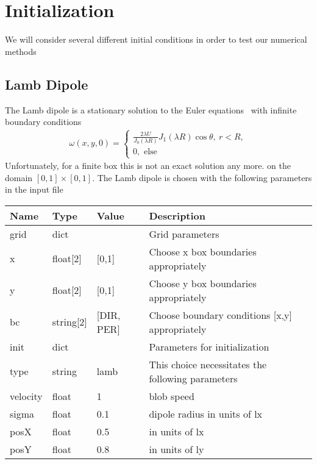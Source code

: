 \section{Initialization}
We will consider several different initial conditions in order to test
our numerical methods
\subsection{Lamb Dipole}
The Lamb dipole is a stationary solution to the Euler equations~\cite{Nielsen1997} with infinite
boundary conditions
\begin{align}
    \omega(x,y,0) = \begin{cases}
        \frac{2\lambda U}{J_0(\lambda R)} J_1(\lambda R) \cos \theta,\ r < R,\\
        0, \text{ else}
    \end{cases}
\end{align}
Unfortunately, for a finite box this is not an exact solution any more.
on the domain $[0,1]\times [0,1]$.
The Lamb dipole is chosen with the following parameters in the input file
\begin{longtable}{llll}
\toprule
\rowcolor{gray!50}\textbf{Name} &  \textbf{Type} & \textbf{Value}  & \textbf{Description}  \\ \midrule
grid & dict &  & Grid parameters \\
\qquad x & float[2]& [0,1] & Choose x box boundaries appropriately \\
\qquad y & float[2]& [0,1] & Choose y box boundaries appropriately \\
\qquad bc & string[2] & [DIR, PER] & Choose boundary conditions [x,y] appropriately \\
init &  dict &   & Parameters for initialization \\
\qquad type      & string & lamb & This choice necessitates the following parameters \\
\qquad velocity  & float &  1    &  blob speed \\
\qquad sigma     & float &  0.1  & dipole radius in units of lx \\
\qquad posX      & float &  0.5  & in units of lx \\
\qquad posY      & float &  0.8  & in units of ly \\
\bottomrule
\end{longtable}
